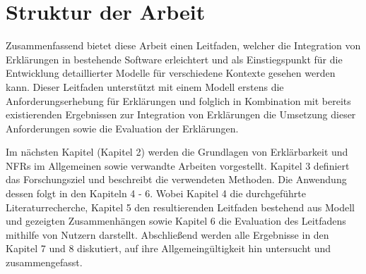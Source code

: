 \section{Struktur der Arbeit}

Zusammenfassend bietet diese Arbeit einen Leitfaden, welcher die Integration von Erklärungen in bestehende Software erleichtert und als Einstiegspunkt für die Entwicklung detaillierter Modelle für verschiedene Kontexte gesehen werden kann. Dieser Leitfaden unterstützt mit einem Modell erstens die Anforderungserhebung für Erklärungen und folglich in Kombination mit bereits existierenden Ergebnissen zur Integration von Erklärungen die Umsetzung dieser Anforderungen sowie die Evaluation der Erklärungen.

Im nächsten Kapitel (Kapitel 2) werden die Grundlagen von Erklärbarkeit und NFRs im Allgemeinen sowie verwandte Arbeiten vorgestellt. Kapitel 3 definiert das Forschungsziel und beschreibt die verwendeten Methoden. Die Anwendung dessen folgt in den Kapiteln 4 - 6. Wobei Kapitel 4 die durchgeführte Literaturrecherche, Kapitel 5 den resultierenden Leitfaden bestehend aus Modell und gezeigten Zusammenhängen sowie Kapitel 6 die Evaluation des Leitfadens mithilfe von Nutzern darstellt. Abschließend werden alle Ergebnisse in den Kapitel 7 und 8 diskutiert, auf ihre Allgemeingültigkeit hin untersucht und zusammengefasst.